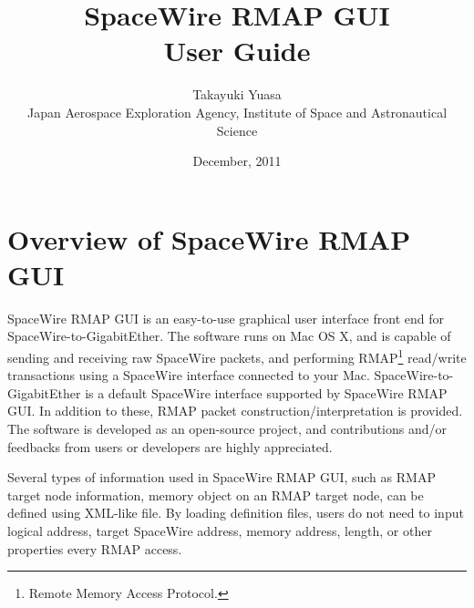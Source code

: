 \documentclass[a4paper,10pt]{article}
\title{\Huge{
SpaceWire RMAP GUI}\\
\Large{User Guide}}
\author{
{\Large
Takayuki Yuasa
}\\
{\small Japan Aerospace Exploration Agency, Institute of Space and Astronautical Science}\\
}
\date{December, 2011}
\begin{document}
\maketitle
\tableofcontents

\setcounter{page}{2}

\section{Overview of SpaceWire RMAP GUI}
SpaceWire RMAP GUI is an easy-to-use graphical user interface front end for SpaceWire-to-GigabitEther. The software runs on Mac OS X, and is capable of sending and receiving raw SpaceWire packets, and performing RMAP\footnote{Remote Memory Access Protocol.} read/write transactions using a SpaceWire interface connected to your Mac. SpaceWire-to-GigabitEther is a default SpaceWire interface supported by SpaceWire RMAP GUI. 
In addition to these, RMAP packet construction/interpretation is provided. The software is developed as an open-source project, and contributions and/or feedbacks from users or developers are highly appreciated.

Several types of information used in SpaceWire RMAP GUI, such as RMAP target node information, memory object on an RMAP target node, can be defined using XML-like file. By loading definition files, users do not need to input logical address, target SpaceWire address, memory address, length, or other properties every RMAP access.
\end{document}

